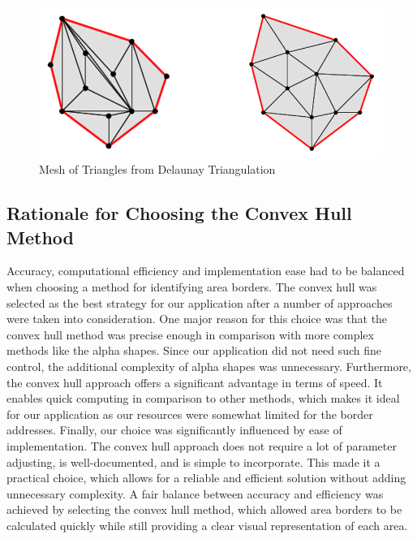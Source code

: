     \begin{figure} [H]
        \centering
        \includegraphics [width=.75\textwidth] {images/andreas/areaBorders/dtPic.png}
        \caption{Mesh of Triangles from Delaunay Triangulation \autocite{Andi:dtPic}}
    \end{figure}

    \subsection{Rationale for Choosing the Convex Hull Method}
    Accuracy, computational efficiency and implementation ease had to be balanced when choosing a method for identifying area borders. The convex hull was selected as the best strategy for our application after a number of approaches were taken into consideration. \newline
    One major reason for this choice was that the convex hull method was precise enough in comparison with more complex methods like the alpha shapes. Since our application did not need such fine control, the additional complexity of alpha shapes was unnecessary. \newline
    Furthermore, the convex hull approach offers a significant advantage in terms of speed. It enables quick computing in comparison to other methods, which makes it ideal for our application as our resources were somewhat limited for the border addresses. \newline
    Finally, our choice was significantly influenced by ease of implementation. The convex hull approach does not require a lot of parameter adjusting, is well-documented, and is simple to incorporate. This made it a practical choice, which allows for a reliable and efficient solution without adding unnecessary complexity. \newline
    A fair balance between accuracy and efficiency was achieved by selecting the convex hull method, which allowed area borders to be calculated quickly while still providing a clear visual representation of each area.

    \pagebreak
    
